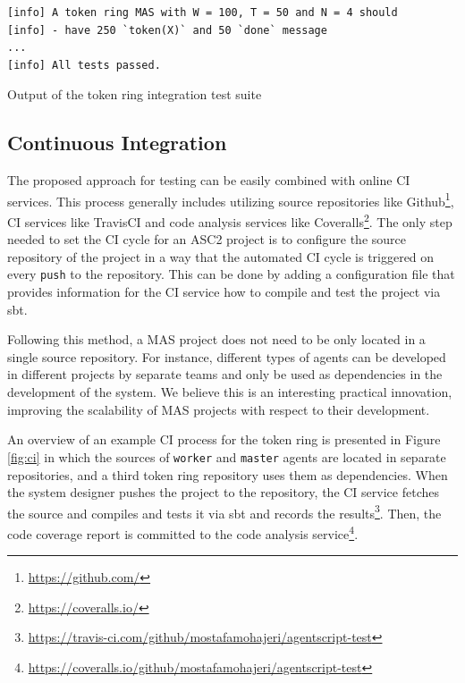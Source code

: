 \begin{listing}[!h]\vspace{-10pt}
\begin{Verbatim}[fontsize=\small]
[info] A token ring MAS with W = 100, T = 50 and N = 4 should
[info] - have 250 `token(X)` and 50 `done` message
...
[info] All tests passed.
\end{Verbatim}
\vspace{-5pt}
    \caption{Output of the token ring integration test suite}
    \label{lst:result_2}
\end{listing}


\vspace{-20pt}
\subsection{Continuous Integration}
The proposed approach for testing can be easily combined with online CI services. This process generally includes utilizing source repositories like Github\footnote{\url{https://github.com/}}, CI services like TravisCI and code analysis services like Coveralls\footnote{\url{https://coveralls.io/}}. The only step needed to set  the CI cycle for an ASC2 project is to configure the source repository of the project in a way that the automated CI cycle is triggered on every \texttt{push} to the repository. This can be done by adding a configuration file that provides information for the CI service how to compile and test the project via sbt.%

Following this method, a MAS project does not need to be only located in a single source repository. For instance, different types of agents can be developed in different projects by separate teams and only be used as dependencies in the development of the system. We believe this is an interesting practical innovation, improving the scalability of MAS projects with respect to their development. 


An overview of an example CI process for the token ring is presented in Figure \ref{fig:ci} in which the sources of \texttt{worker} and \texttt{master} agents are located in separate repositories, and a third token ring repository uses them as dependencies. When the system designer pushes the project to the repository, the CI service fetches the source and compiles and tests it via sbt and records the results\footnote{\url{https://travis-ci.com/github/mostafamohajeri/agentscript-test}}. Then, the code coverage report is committed to the code analysis service\footnote{\url{https://coveralls.io/github/mostafamohajeri/agentscript-test}}.


